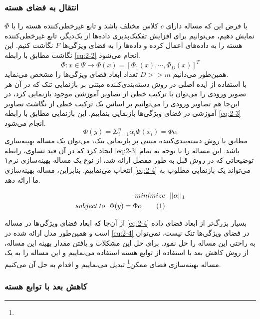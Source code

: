 \documentclass[12pt,twocolumn]{article}
\newcommand\numberthis[1][]{%
    \refstepcounter{equation}%
    \ifx#1\empty\else\label{eq:#1}\fi%
    \tag{\theequation}%
}
\newcommand{\enfootnote}[1]{\footnote{\lr{#1}}}
\begin{document}
\subsubsection{انتقال به فضای هسته}
با فرض این که مساله دارای $c$ کلاس مختلف باشد و تابع غیرخطی‌کننده هسته را با $\Phi$ نمایش دهیم، می‌توانیم برای افزایش تفکیک‌پذیری داده‌ها از یک‌دیگر، تابع غیرخطی‌کننده هسته را به داده‌های اعمال کرده و داده‌ها را به فضای ویژگی‌ها $F$ نگاشت کنیم. این نگاشت مطابق با رابطه \eqref{eq:2-2} انجام می‌شود.
\begin{equation}
\Phi: x \in \Psi \rightarrow \Phi(x) = [\Phi_1(x), \cdots, \Phi_D(x)]^T
\label{eq:2-2}
\end{equation}
همین‌طور می‌دانیم $D >> m$ تعداد ابعاد فضای ویژگی‌ها را مشخص می‌نماید. 
\\
با استفاده از ایده اصلی در روش دسته‌بندی‌کننده مبتنی بر بازنمایی تنک که در آن هر تصویر ورودی را می‌توان با ترکیب خطی از تصاویر آموزشی موجود بازنمایی کرد، در این‌جا هم تصاویر ورودی را می‌توانیم بر اساس یک ترکیب خطی از نگاشت تصاویر آموزشی در فضای ویژگی‌ها بازنمایی بنماییم. این بازنمایی مطابق با رابطه \eqref{eq:2-3} انجام می‌شود.
\begin{equation}
\Phi(y) = \Sigma_{i=1}^n \alpha_i\Phi(x_i) = \Phi\alpha
\label{eq:2-3}
\end{equation}
مطابق با روش دسته‌بندی‌کننده مبتنی بر بازنمایی تنک، می‌توان یک مساله بهینه‌سازی ایجاد کرد که در آن قید تساوی، رابطه \eqref{eq:2-3} باشد. این مساله را با توجه به تمام توضیحاتی که در روش قبل به طور مفصل ارائه شد، از نوع یک مساله بهینه‌سازی نرم۱ انتخاب می‌نماییم. بنابراین، مساله بهینه‌سازی \eqref{eq:2-4} می‌تواند یک بازنمایی مطلوب به ما ارائه دهد.

\begin{align*}
minimize& \>\>\> ||\alpha||_1 \\
subject\>to \>\>\> \Phi(y) = \Phi\alpha
\numberthis
\label{eq:2-4}
\end{align*}

از آن‌جا که ابعاد فضای ویژگی‌ها در مساله \eqref{eq:2-4} بسیار بزرگ‌تر از ابعاد فضای داده است و همین‌طور مدل ارائه شده در \eqref{eq:2-4} در فضای ویژگی‌ها تنک نیست، نمی‌توان به راحتی این مساله را حل نمود. برای حل این مشکلات و یافتن مقدار بهینه این مساله، از روش کاهش بعد با استفاده از توابع هسته استفاده می‌نماییم و این مساله را به یک مساله بهینه‌سازی فضای ممکن\enfootnote{Feasible Optimization Problem} تبدیل می‌نماییم و اقدام به حل آن می‌کنیم.

\subsubsection{کاهش بعد با توابع هسته}
\end{document}
